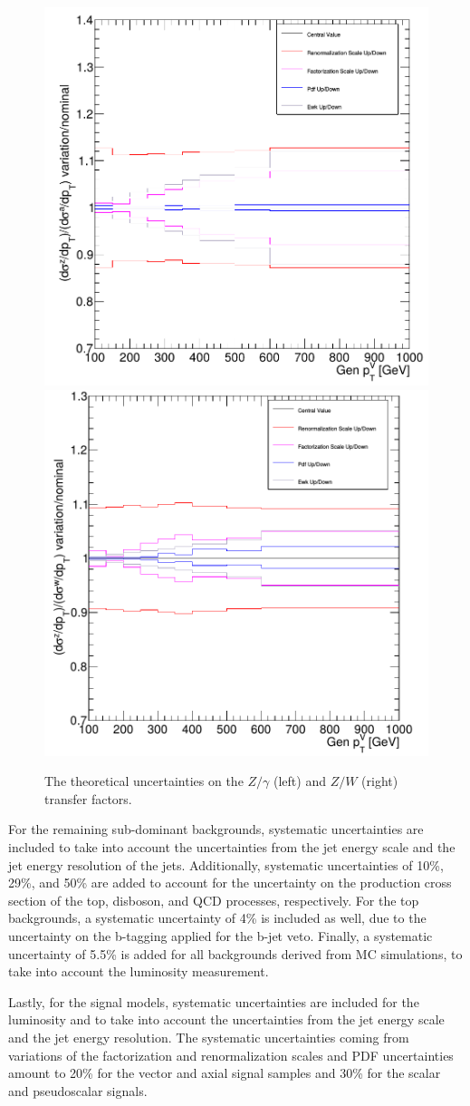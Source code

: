 \begin{figure}[p]
  \centering
 \includegraphics[width=.49\textwidth]{syst1.png} 
 \includegraphics[width=.49\textwidth]{syst2.png}
 \caption{The theoretical uncertainties on the $Z/\gamma$ (left) and $Z/W$ (right) transfer factors.}
 \label{fig:transfer_factors_unc}
\end{figure}

For the remaining sub-dominant backgrounds, systematic uncertainties are included to take into account the uncertainties from the jet energy scale and the jet energy resolution of the jets. Additionally, systematic uncertainties  of 10\%, 29\%, and 50\% are added to account for the uncertainty on the production cross section of the top, disboson, and QCD processes, respectively. For the top backgrounds, a systematic uncertainty of 4\% is included as well, due to the uncertainty on the b-tagging applied for the b-jet veto. Finally, a systematic uncertainty of 5.5\% is added for all backgrounds derived from MC simulations, to take into account the luminosity measurement.

Lastly, for the signal models, systematic uncertainties are included for the luminosity and to take into account the uncertainties from the jet energy scale and the jet energy resolution. The systematic uncertainties coming from variations of the factorization and renormalization scales and PDF uncertainties amount to 20\% for the vector and axial signal samples and 30\% for the scalar and pseudoscalar signals.

